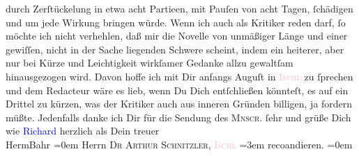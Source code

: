                durch Zerſtückelung in etwa acht Partieen, mit Pauſen von acht Tagen, ſchädigen und
               um jede Wirkung bringen würde. Wenn ich auch als Kritiker reden darf, ſo möchte ich
               nicht verhehlen, daß mir die Novelle von unmäßiger Länge und {\pb}einer gewiſſen, nicht in der Sache liegenden
               Schwere scheint, indem ein heiterer, aber nur bei Kürze und Leichtigkeit wirkſamer
               Gedanke allzu gewaltſam hinausgezogen wird. Davon hoffe ich mit Dir anfangs Auguſt in
                  \textcolor{pink}{\textsc{Ischl}}{}\ledrightnote{\textcolor{pink}{Bad Ischl}} zu ſprechen und dem Redacteur wäre es lieb, wenn Du Dich entſchließen könnteſt,
               es auf ein Drittel zu kürzen, was der Kritiker auch aus inneren Gründen billigen, ja
               fordern müßte. Jedenfalls danke ich Dir für die Sendung des \textsc{Mnscr}. ſehr und grüße Dich wie \textcolor{blue}{Richard}{}\ledrightnote{\textcolor{blue}{Richard Beer-Hofmann}} herzlich\pend
           \pstart
           als Dein treuer{\\[\baselineskip]}\spacefill\mbox{HermBahr}\pend
           \leftskip=0em{}\pstart
           \noindent{}Herrn \textsc{Dr Arthur Schnitzler, \textcolor{pink}{Ischl}{}\ledrightnote{\textcolor{pink}{Bad Ischl}}}\pend
           \leftskip=3em{}\pstart
           \noindent{}reco{\geminationm}andieren.\pend
           \leftskip=0em{}\pstart
           \textcolor{gray}{\textbf{\label{T_L00465_1v}\label{T_L00465_1h}}}\pend
           \endnumbering{}  
      